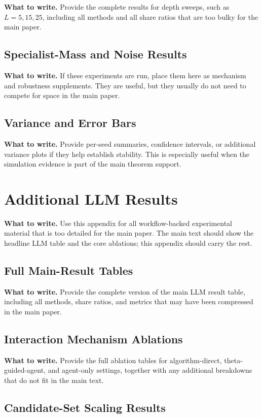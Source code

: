 \documentclass{article}
\newcommand{\towrite}[1]{\noindent\textbf{What to write.} #1}
\begin{document}
\towrite{Provide the complete results for depth sweeps, such as $L=5,15,25$, including all methods and all share ratios that are too bulky for the main paper.}

\subsection{Specialist-Mass and Noise Results}

\towrite{If these experiments are run, place them here as mechanism and robustness supplements. They are useful, but they usually do not need to compete for space in the main paper.}

\subsection{Variance and Error Bars}

\towrite{Provide per-seed summaries, confidence intervals, or additional variance plots if they help establish stability. This is especially useful when the simulation evidence is part of the main theorem support.}

\section{Additional LLM Results}

\towrite{Use this appendix for all workflow-backed experimental material that is too detailed for the main paper. The main text should show the headline LLM table and the core ablations; this appendix should carry the rest.}

\subsection{Full Main-Result Tables}

\towrite{Provide the complete version of the main LLM result table, including all methods, share ratios, and metrics that may have been compressed in the main paper.}

\subsection{Interaction Mechanism Ablations}

\towrite{Provide the full ablation tables for algorithm-direct, theta-guided-agent, and agent-only settings, together with any additional breakdowns that do not fit in the main text.}

\subsection{Candidate-Set Scaling Results}
\end{document}
